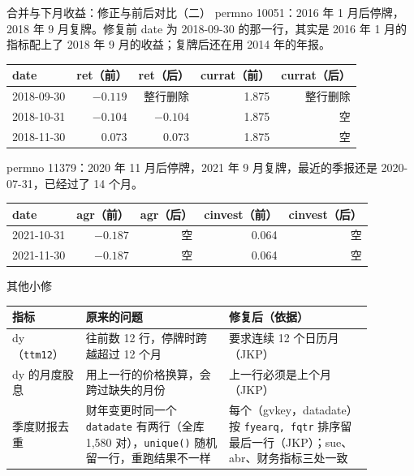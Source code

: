 \documentclass[UTF8,fontset=fandol,aspectratio=169,10pt,t]{ctexbeamer}
\newcommand{\chg}[1]{\textcolor{red!80!black}{#1}}
\newcommand{\kong}{空}
\newcommand{\code}[1]{\texttt{#1}}
\newcommand{\tsize}{\small}
\newcommand{\src}[1]{{\footnotesize\color{black!60}#1}}
\begin{document}
\begin{frame}{合并与下月收益：修正与前后对比（二）}
\src{permno 10051：2016 年 1 月后停牌，2018 年 9 月复牌。修复前 date 为 2018-09-30 的那一行，其实是 2016 年 1 月的指标配上了 2018 年 9 月的收益；复牌后还在用 2014 年的年报。}\par\smallskip
{\tsize
\begin{tabular}{l rr rr}
\toprule
date & ret（前） & ret（后） & currat（前） & currat（后） \\
\midrule
2018-09-30 & $-0.119$ & \chg{整行删除} & 1.875 & \chg{整行删除} \\
2018-10-31 & $-0.104$ & $-0.104$ & 1.875 & \chg{\kong} \\
2018-11-30 & $0.073$ & $0.073$ & 1.875 & \chg{\kong} \\
\bottomrule
\end{tabular}}
\par\bigskip
\src{permno 11379：2020 年 11 月后停牌，2021 年 9 月复牌，最近的季报还是 2020-07-31，已经过了 14 个月。}\par\smallskip
{\tsize
\begin{tabular}{l rr rr}
\toprule
date & agr（前） & agr（后） & cinvest（前） & cinvest（后） \\
\midrule
2021-10-31 & $-0.187$ & \chg{\kong} & 0.064 & \chg{\kong} \\
2021-11-30 & $-0.187$ & \chg{\kong} & 0.064 & \chg{\kong} \\
\bottomrule
\end{tabular}}
\end{frame}

\begin{frame}{其他小修}
{\tsize
\begin{tabular}{p{0.18\linewidth} p{0.35\linewidth} p{0.35\linewidth}}
\toprule
指标 & 原来的问题 & 修复后（依据） \\
\midrule
dy（\code{ttm12}） & 往前数 12 行，停牌时跨越超过 12 个月 & 要求连续 12 个日历月（JKP） \\
dy 的月度股息 & 用上一行的价格换算，会跨过缺失的月份 & 上一行必须是上个月（JKP） \\
季度财报去重 & 财年变更时同一个 \code{datadate} 有两行（全库 1,580 对），\code{unique()} 随机留一行，重跑结果不一样 & 每个（gvkey，datadate）按 \code{fyearq, fqtr} 排序留最后一行（JKP）；sue、abr、财务指标三处一致 \\
\bottomrule
\end{tabular}}
\end{frame}
\end{document}
